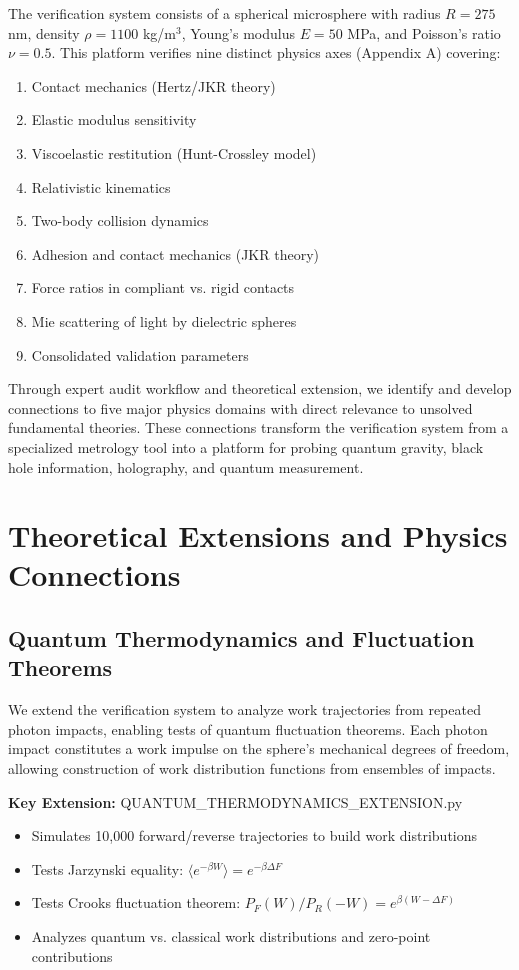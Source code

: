 \documentclass[12pt,twoside]{article}
\begin{document}
The verification system consists of a spherical microsphere with radius $R = 275$ nm, density $\rho = 1100$ kg/m$^3$, Young's modulus $E = 50$ MPa, and Poisson's ratio $\nu = 0.5$. This platform verifies nine distinct physics axes (Appendix A) covering:
\begin{enumerate}
\item Contact mechanics (Hertz/JKR theory)
\item Elastic modulus sensitivity
\item Viscoelastic restitution (Hunt-Crossley model)
\item Relativistic kinematics
\item Two-body collision dynamics
\item Adhesion and contact mechanics (JKR theory)
\item Force ratios in compliant vs. rigid contacts
\item Mie scattering of light by dielectric spheres
\item Consolidated validation parameters
\end{enumerate}

Through expert audit workflow and theoretical extension, we identify and develop connections to five major physics domains with direct relevance to unsolved fundamental theories. These connections transform the verification system from a specialized metrology tool into a platform for probing quantum gravity, black hole information, holography, and quantum measurement.

\section{Theoretical Extensions and Physics Connections}

\subsection{Quantum Thermodynamics and Fluctuation Theorems}
We extend the verification system to analyze work trajectories from repeated photon impacts, enabling tests of quantum fluctuation theorems. Each photon impact constitutes a work impulse on the sphere's mechanical degrees of freedom, allowing construction of work distribution functions from ensembles of impacts.

\textbf{Key Extension:} QUANTUM\_THERMODYNAMICS\_EXTENSION.py
\begin{itemize}
\item Simulates 10,000 forward/reverse trajectories to build work distributions
\item Tests Jarzynski equality: $\langle e^{-\beta W} \rangle = e^{-\beta \Delta F}$
\item Tests Crooks fluctuation theorem: $P_F(W)/P_R(-W) = e^{\beta(W-\Delta F)}$
\item Analyzes quantum vs. classical work distributions and zero-point contributions
\end{itemize}
\end{document}
